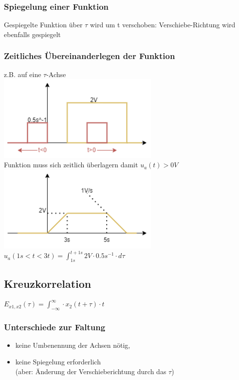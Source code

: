 \documentclass{article}
\begin{document}
\subsubsection*{Spiegelung einer Funktion}
Gespiegelte Funktion über $\tau$ wird um t verschoben: Verschiebe-Richtung wird ebenfalls gespiegelt

\subsubsection*{Zeitliches Übereinanderlegen der Funktion}
z.B. auf eine $\tau$-Achse \\
\includegraphics[width=0.6\textwidth]{img/2024_11_27_achsenverschiebung.png} \\
Funktion muss sich zeitlich überlagern damit $u_a(t) > 0V$ \\
\includegraphics[width=0.6\textwidth]{img/2024_11_27_rect_multiplikation.png} \\
$u_a(1s < t < 3t) = \int_{1s}^{t+1s} 2V \cdot 0.5s^{-1} \cdot d\tau$

\subsection*{Kreuzkorrelation}
$E_{x1,x2}(\tau) = \int_{-\infty}^{\infty}\cdot x_2(t+\tau) \cdot t$ \\
\subsubsection*{Unterschiede zur Faltung}
\begin{itemize}
	\item keine Umbenennung der Achsen nötig, 
	\item keine Spiegelung erforderlich \\
	(aber: Änderung der Verschieberichtung durch das $\tau$)
\end{itemize}
\end{document}
